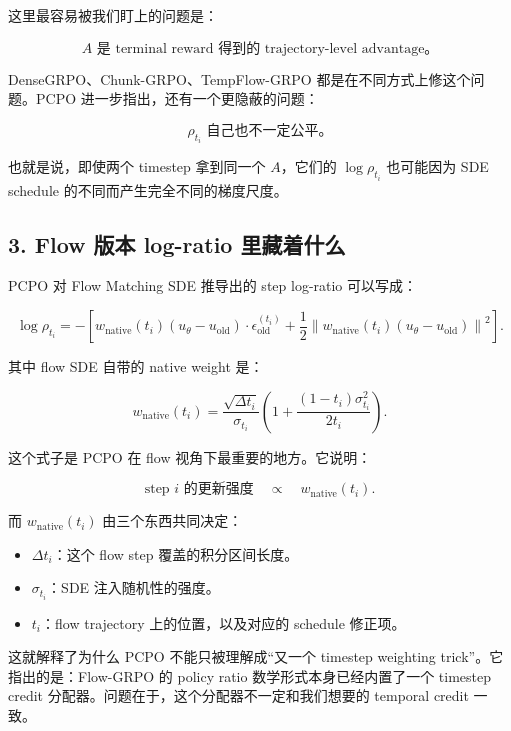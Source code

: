 这里最容易被我们盯上的问题是：

\[
A \text{ 是 terminal reward 得到的 trajectory-level advantage。}
\]

DenseGRPO、Chunk-GRPO、TempFlow-GRPO 都是在不同方式上修这个问题。PCPO 进一步指出，还有一个更隐蔽的问题：

\[
\rho_{t_i} \text{ 自己也不一定公平。}
\]

也就是说，即使两个 timestep 拿到同一个 \(A\)，它们的 \(\log\rho_{t_i}\) 也可能因为 SDE schedule 的不同而产生完全不同的梯度尺度。

\subsection{3. Flow 版本 log-ratio 里藏着什么}

PCPO 对 Flow Matching SDE 推导出的 step log-ratio 可以写成：

\[
\log\rho_{t_i}
=
-
\left[
w_{\mathrm{native}}(t_i)
\left(
u_\theta - u_{\mathrm{old}}
\right)
\cdot
\epsilon_{\mathrm{old}}^{(t_i)}
+
\frac{1}{2}
\left\|
w_{\mathrm{native}}(t_i)
\left(
u_\theta - u_{\mathrm{old}}
\right)
\right\|^2
\right].
\]

其中 flow SDE 自带的 native weight 是：

\[
w_{\mathrm{native}}(t_i)
=
\frac{\sqrt{\Delta t_i}}{\sigma_{t_i}}
\left(
1+
\frac{(1-t_i)\sigma_{t_i}^2}{2t_i}
\right).
\]

这个式子是 PCPO 在 flow 视角下最重要的地方。它说明：

\[
\text{step } i \text{ 的更新强度}
\quad
\propto
\quad
w_{\mathrm{native}}(t_i).
\]

而 \(w_{\mathrm{native}}(t_i)\) 由三个东西共同决定：

\begin{itemize}[leftmargin=2em]
  \item \(\Delta t_i\)：这个 flow step 覆盖的积分区间长度。
  \item \(\sigma_{t_i}\)：SDE 注入随机性的强度。
  \item \(t_i\)：flow trajectory 上的位置，以及对应的 schedule 修正项。
\end{itemize}

\begin{warnbox}
这就解释了为什么 PCPO 不能只被理解成“又一个 timestep weighting trick”。它指出的是：Flow-GRPO 的 policy ratio 数学形式本身已经内置了一个 timestep credit 分配器。问题在于，这个分配器不一定和我们想要的 temporal credit 一致。
\end{warnbox}

